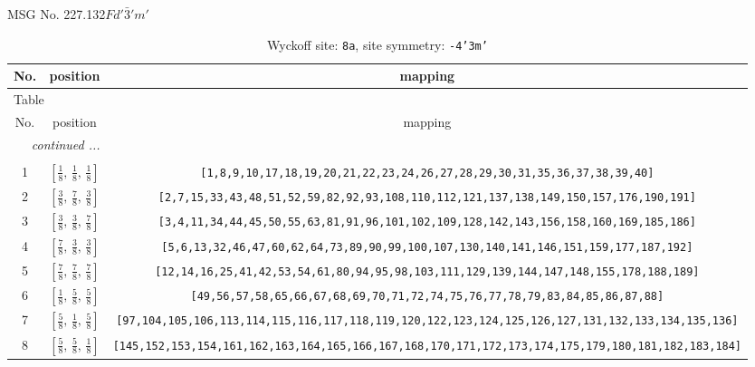 \documentclass[fleqn,8pt]{jsarticle}
\begin{document}
\setcounter{MaxMatrixCols}{32}

\renewcommand{\tablename}{Table~}
\renewcommand{\figurename}{Figure~}
\begin{center}
\LARGE
MSG No. 227.132\quad$Fd'\bar{3}'m'$
\end{center}
\renewcommand{\arraystretch}{1.2}
\begin{longtable}{ccc}
\caption{Wyckoff site: {\tt 8a}, site symmetry: {\tt -4'3m'}}
 \\
 \hline \hline
No. & position & mapping \\ \hline \endfirsthead

\multicolumn{2}{l}{\tablename\ \thetable{}} \\
 \hline \hline
No. & position & mapping \\ \hline \endhead

 \hline \hline
\multicolumn{2}{r}{\footnotesize\it continued ...} \\ \endfoot

 \hline \hline
\multicolumn{2}{r}{} \\ \endlastfoot

1 & $\left[ \frac{1}{8},\, \frac{1}{8},\, \frac{1}{8} \right]$ & {\tt [1,8,9,10,17,18,19,20,21,22,23,24,26,27,28,29,30,31,35,36,37,38,39,40]} \\ \hline
2 & $\left[ \frac{3}{8},\, \frac{7}{8},\, \frac{3}{8} \right]$ & {\tt [2,7,15,33,43,48,51,52,59,82,92,93,108,110,112,121,137,138,149,150,157,176,190,191]} \\ \hline
3 & $\left[ \frac{3}{8},\, \frac{3}{8},\, \frac{7}{8} \right]$ & {\tt [3,4,11,34,44,45,50,55,63,81,91,96,101,102,109,128,142,143,156,158,160,169,185,186]} \\ \hline
4 & $\left[ \frac{7}{8},\, \frac{3}{8},\, \frac{3}{8} \right]$ & {\tt [5,6,13,32,46,47,60,62,64,73,89,90,99,100,107,130,140,141,146,151,159,177,187,192]} \\ \hline
5 & $\left[ \frac{7}{8},\, \frac{7}{8},\, \frac{7}{8} \right]$ & {\tt [12,14,16,25,41,42,53,54,61,80,94,95,98,103,111,129,139,144,147,148,155,178,188,189]} \\ \hline
6 & $\left[ \frac{1}{8},\, \frac{5}{8},\, \frac{5}{8} \right]$ & {\tt [49,56,57,58,65,66,67,68,69,70,71,72,74,75,76,77,78,79,83,84,85,86,87,88]} \\ \hline
7 & $\left[ \frac{5}{8},\, \frac{1}{8},\, \frac{5}{8} \right]$ & {\tt [97,104,105,106,113,114,115,116,117,118,119,120,122,123,124,125,126,127,131,132,133,134,135,136]} \\ \hline
8 & $\left[ \frac{5}{8},\, \frac{5}{8},\, \frac{1}{8} \right]$ & {\tt [145,152,153,154,161,162,163,164,165,166,167,168,170,171,172,173,174,175,179,180,181,182,183,184]} \\
\end{longtable}
\end{document}
